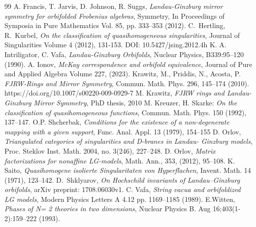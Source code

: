 \documentclass[reqno,12pt]{amsart}
\numberwithin{equation}{section}
\theoremstyle{plain}
\theoremstyle{definition}
\begin{document}
\begin{thebibliography}{99}
    A. Francis, T. Jarvis, D. Johnson, R. Suggs, \emph{Landau-Ginzburg mirror symmetry for orbifolded Frobenius algebras}, Symmetry, In Proceedings of Symposia in Pure Mathematics Vol. 85, pp. 333–353 (2012).
	C.~Hertling, R.~Kurbel, \emph{On the classification of quasihomogeneous singularities}, Journal of Singularities Volume 4 (2012), 131-153. DOI: 10.5427/jsing.2012.4h
    K. A. Intriligator, C. Vafa, \emph{Landau-Ginzburg Orbifolds}, Nuclear Physics, B339:95–120 (1990).
    A. Ionov, \emph{McKay correspondence and orbifold equivalence}, Journal of Pure and Applied Algebra Volume 227, (2023).
    Krawitz, M., Priddis, N., Acosta, P. \emph{FJRW-Rings and Mirror Symmetry}, Commun. Math. Phys. 296, 145–174 (2010). https://doi.org/10.1007/s00220-009-0929-7
    M. Krawitz, \emph{FJRW rings and Landau-Ginzburg Mirror Symmetry}, 	PhD thesis, 2010
    M. Kreuzer, H. Skarke: \emph{On the classification of quasihomogeneous functions}, Commun. Math. Phys. {150} (1992), 137--147.
    O.P. Shcherbak, \emph{Conditions for the existence of a non-degenerate mapping with a given support}, Func. Anal. Appl. {13} (1979), 154--155
    D. Orlov, \emph{Triangulated categories of singularities and D-branes in Landau- Ginzburg models}, Proc. Steklov Inst. Math. 2004, no. 3(246), 227–248.
    D. Orlov, \emph{Matrix factorizations for nonaffine LG-models}, Math. Ann., 353, (2012), 95–108.
    K. Saito, \emph{ Quasihomogene isolierte Singularitaten von Hyperflachen},
    Invent. Math. {14} (1971), 123--142.
	D.~Shklyarov, \emph{On Hochschild invariants of Landau--Ginzburg orbifolds}, arXiv preprint: 1708.06030v1.
    C. Vafa, \emph{String vacua and orbifoldized LG models}, Modern Physics Letters A 4.12 pp. 1169–1185 (1989).
    E.Witten, \emph{Phases of N= 2 theories in two dimensions}, Nuclear Physics B. Aug 16;403(1-2):159–222 (1993).


\end{thebibliography}
\end{document}
